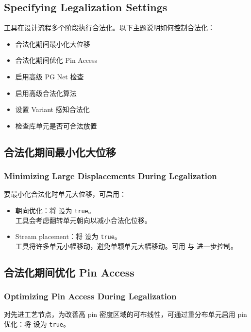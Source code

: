 \subsection*{Specifying Legalization Settings}

工具在设计流程多个阶段执行合法化。以下主题说明如何控制合法化：
\begin{itemize}
  \item 合法化期间最小化大位移
  \item 合法化期间优化 Pin Access
  \item 启用高级 PG Net 检查
  \item 启用高级合法化算法
  \item 设置 Variant 感知合法化
  \item 检查库单元是否可合法放置
\end{itemize}

\subsection{合法化期间最小化大位移}
\subsubsection*{Minimizing Large Displacements During Legalization}

要最小化合法化时单元大位移，可启用：
\begin{itemize}
  \item 朝向优化：将  设为 \texttt{true}。\\
        工具会考虑翻转单元朝向以减小合法化位移。
  \item Stream placement：将  设为 \texttt{true}。\\
        工具将许多单元小幅移动，避免单颗单元大幅移动。可用  与  进一步控制。
\end{itemize}

\subsection{合法化期间优化 Pin Access}
\subsubsection*{Optimizing Pin Access During Legalization}

对先进工艺节点，为改善高 pin 密度区域的可布线性，可通过重分布单元启用 pin 优化：将  设为 \texttt{true}。

